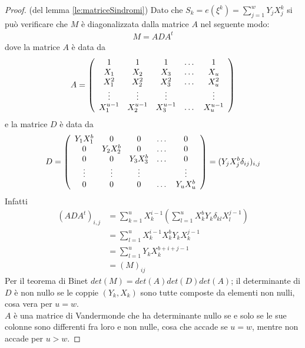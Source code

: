 \begin{proof}(del lemma \ref{le:matriceSindromi})
   Dato che $S_{k} = e(\xi^{k}) = \sum_{j=1}^{w}Y_{j}X_{j}^{k}$ si può verificare che $M$ è diagonalizzata dalla matrice $A$ nel seguente modo:
   \begin{align*}
      M = ADA^{t}
   \end{align*}
   dove la matrice $A$ è data da
   \begin{align*}
      A =
 	\left(
 	\begin{array} {c c c c c}
 	1 & 1 & 1 & \dots & 1   \\
        X_{1} & X_{2} & X_{3} & \dots & X_{u}   \\
        X_{1}^{2} & X_{2}^{2} & X_{3}^{2} & \dots & X_{u}^{2}   \\
        \vdots & \vdots & \vdots &  & \vdots   \\
        X_{1}^{u-1} & X_{2}^{u-1} & X_{3}^{u-1} & \dots & X_{u}^{u-1}         
 	\end{array}
 	\right)
   \end{align*}
   e la matrice $D$ è data da
   \begin{align*}
      D =
 	\left(
 	\begin{array} {c c c c c}
 	Y_{1}X_{1}^{b} & 0 & 0 & \dots & 0   \\
        0 & Y_{2}X_{2}^{b} & 0 & \dots & 0   \\
        0 & 0 & Y_{3}X_{3}^{b} & \dots & 0   \\
        \vdots & \vdots & \vdots &  & \vdots   \\
        0 & 0 & 0 & \dots & Y_{u}X_{u}^{b}        
 	\end{array}
 	\right)
 	=
 	(Y_{j}X_{j}^{b} \delta_{ij})_{i,j}
   \end{align*}
   Infatti
   \begin{align*}
       (ADA^{t})_{i,j} &= \sum_{k=1}^{u} X_{k}^{i-1} (\sum_{l=1}^{u} X_{k}^{b} Y_{k} \delta_{kl} X_{l}^{j-1} ) \\
                       &= \sum_{l=1}^{u} X_{k}^{i-1} X_{k}^{b} Y_{k} X_{k}^{j-1} \\
                       &= \sum_{l=1}^{u} Y_{k} X_{k}^{b+i+j-1} \\
                       &= (M)_{ij} 
   \end{align*}
   Per il teorema di Binet $det(M) = det(A)det(D)det(A)$; il determinante di $D$ è non nullo se le coppie  $(Y_{k},X_{k})$ sono tutte composte da elementi non nulli, cosa vera per $u=w$.\\
   $A$ è una matrice di Vandermonde che ha determinante nullo se e solo se le sue colonne sono differenti fra loro e non nulle, cosa che accade se $u=w$, mentre non accade per $u > w$.
\end{proof}

